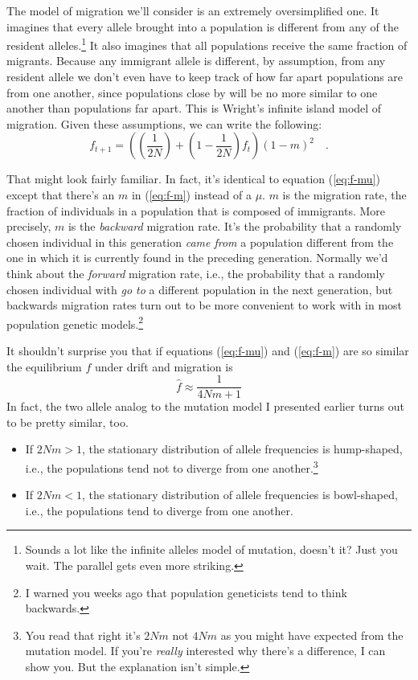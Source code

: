 \documentclass[12pt]{article}
\begin{document}
The model of migration we'll consider is an extremely oversimplified
one. It imagines that every allele brought into a population is
different from any of the resident alleles.\footnote{Sounds a lot like
  the infinite alleles model of mutation, doesn't it? Just you
  wait. The parallel gets even more striking.} It also imagines that
all populations receive the same fraction of migrants. Because any
immigrant allele is different, by assumption, from any resident allele
we don't even have to keep track of how far apart populations are from
one another, since populations close by will be no more similar to one
another than populations far apart. This is Wright's infinite island
model of migration. Given these assumptions, we can write the
following:
\begin{equation}
f_{t+1} = \left(\left(\frac{1}{2N}\right) +
          \left(1 - \frac{1}{2N}\right)f_t\right)(1-m)^2 \quad
\label{eq:f-m} .
\end{equation}

That might look fairly familiar. In fact, it's identical to equation
(\ref{eq:f-mu}) except that there's an $m$ in (\ref{eq:f-m}) instead
of a $\mu$. $m$ is the migration rate, the fraction of individuals in
a population that is composed of immigrants. More precisely, $m$ is
the {\it backward\/} migration rate.
It's the probability that a randomly chosen individual in this
generation {\it came from\/} a population different from the one in
which it is currently found in the preceding generation. Normally we'd
think about the {\it forward\/} migration rate,  i.e., the probability
that a randomly chosen individual with {\it go to\/} a different
population in the next generation, but backwards migration rates turn
out to be more convenient to work with in most population genetic
models.\footnote{I warned you weeks ago that population geneticists
  tend to think backwards.}

It shouldn't surprise you that if equations (\ref{eq:f-mu}) and
(\ref{eq:f-m}) are so similar the equilibrium $f$ under drift and
migration is
\[
\hat f \approx \frac{1}{4Nm + 1}
\]
In fact, the two allele analog to the mutation model I presented
earlier turns out to be pretty similar, too.

\begin{itemize}

\item If $2Nm > 1$, the stationary distribution of allele frequencies
is hump-shaped, i.e., the populations tend not to diverge from one
another.\footnote{You read that right it's $2Nm$ not $4Nm$ as you
might have expected from the mutation model. If you're {\it really\/}
interested why there's a difference, I can show you. But the
explanation isn't simple.}

\item If $2Nm < 1$, the stationary distribution of allele frequencies
is bowl-shaped, i.e., the populations tend to diverge from one another.

\end{itemize}
\end{document}
